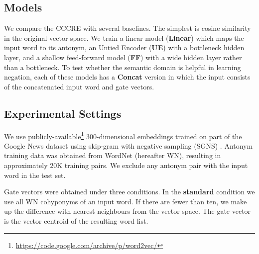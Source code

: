 \documentclass[11pt]{article}
\begin{document}
\subsection{Models}

We compare the CCCRE with several baselines. The simplest is cosine similarity in the original vector space. We train a linear model ({\bf Linear}) which maps the input word to its antonym, an Untied Encoder ({\bf UE}) with a bottleneck hidden layer, and a shallow feed-forward model ({\bf FF}) with a wide hidden layer rather than a bottleneck. To test whether the semantic domain is helpful in learning negation, each of these models has a {\bf Concat} version in which the input consists of the concatenated input word and gate vectors. 

\subsection{Experimental Settings}

We use publicly-available\footnote{\url{https://code.google.com/archive/p/word2vec/}} 300-dimensional embeddings trained on part of the Google News dataset using skip-gram with negative sampling (SGNS) \citep{mikolov:13}.
Antonym training data was obtained from WordNet \citep{wordnet} (hereafter WN), resulting in approximately 20K training pairs.
We exclude any antonym pair with the input word in the test set.

Gate vectors were obtained under three conditions. In the {\bf
  standard} condition we use all WN cohyponyms of an input word. If
there are fewer than ten, we make up the difference with nearest neighbours
from the 
vector space. The gate vector is 
the vector centroid of the resulting word list.


\end{document}
